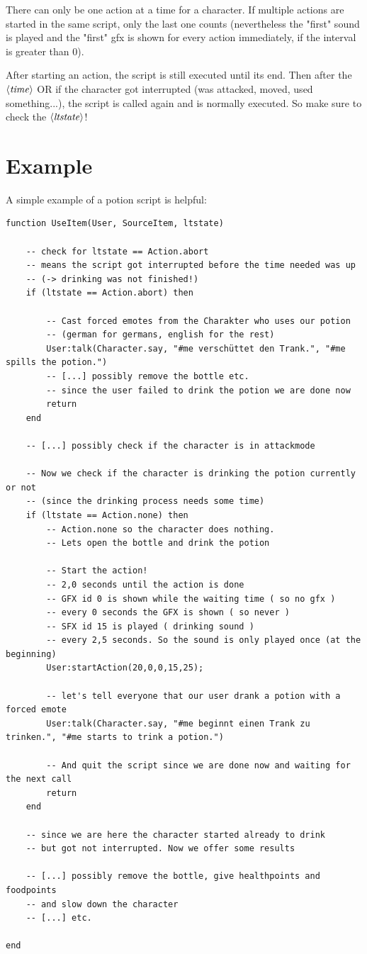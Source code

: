 \documentclass[a4paper,10pt,makeidx]{scrreprt}
\newcommand{\var}[1]{$\left\langle \text{\emph{#1}} \right\rangle$}
\begin{document}
There can only be one action at a time for a character. If multiple actions are started in the same script, only the last one counts (nevertheless the "first" sound is played and the "first" gfx is shown for every action immediately, if the interval is greater than 0).

After starting an action, the script is still executed until its end. Then after the \var{time} OR if the character got interrupted (was attacked, moved, used something...), the script is called again and is normally executed. So make sure to check the \var{ltstate}!

\section{Example}
A simple example of a potion script is helpful:

\begin{verbatim}
function UseItem(User, SourceItem, ltstate)

    -- check for ltstate == Action.abort
    -- means the script got interrupted before the time needed was up
    -- (-> drinking was not finished!)
    if (ltstate == Action.abort) then

        -- Cast forced emotes from the Charakter who uses our potion
        -- (german for germans, english for the rest)
        User:talk(Character.say, "#me verschüttet den Trank.", "#me spills the potion.")
        -- [...] possibly remove the bottle etc.
        -- since the user failed to drink the potion we are done now
        return
    end

    -- [...] possibly check if the character is in attackmode

    -- Now we check if the character is drinking the potion currently or not
    -- (since the drinking process needs some time)
    if (ltstate == Action.none) then
        -- Action.none so the character does nothing.
        -- Lets open the bottle and drink the potion

        -- Start the action!
        -- 2,0 seconds until the action is done
        -- GFX id 0 is shown while the waiting time ( so no gfx )
        -- every 0 seconds the GFX is shown ( so never )
        -- SFX id 15 is played ( drinking sound )
        -- every 2,5 seconds. So the sound is only played once (at the beginning)
        User:startAction(20,0,0,15,25);

        -- let's tell everyone that our user drank a potion with a forced emote
        User:talk(Character.say, "#me beginnt einen Trank zu trinken.", "#me starts to trink a potion.")

        -- And quit the script since we are done now and waiting for the next call
        return
    end

    -- since we are here the character started already to drink
    -- but got not interrupted. Now we offer some results

    -- [...] possibly remove the bottle, give healthpoints and foodpoints
    -- and slow down the character
    -- [...] etc.

end
\end{verbatim}
\end{document}
